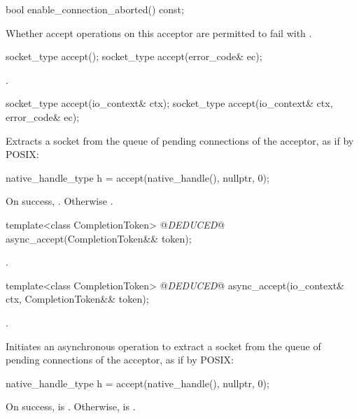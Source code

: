 \begin{itemdecl}
bool enable_connection_aborted() const;
\end{itemdecl}

\begin{itemdescr}
\pnum
\returns Whether accept operations on this acceptor are permitted to fail with .
\end{itemdescr}

\begin{itemdecl}
socket_type accept();
socket_type accept(error_code& ec);
\end{itemdecl}

\begin{itemdescr}
\pnum
\returns {}.
\end{itemdescr}

\begin{itemdecl}
socket_type accept(io_context& ctx);
socket_type accept(io_context& ctx, error_code& ec);
\end{itemdecl}

\begin{itemdescr}
\pnum
\effects Extracts a socket from the queue of pending connections of the acceptor, as if by POSIX: 
\begin{codeblock}
native_handle_type h = accept(native_handle(), nullptr, 0);
\end{codeblock}


\pnum
\returns On success, . Otherwise .
\end{itemdescr}

\begin{itemdecl}
template<class CompletionToken>
  @\textit{DEDUCED}@ async_accept(CompletionToken&& token);
\end{itemdecl}

\begin{itemdescr}
\pnum
\returns {}.
\end{itemdescr}

\begin{itemdecl}
template<class CompletionToken>
  @\textit{DEDUCED}@ async_accept(io_context& ctx, CompletionToken&& token);
\end{itemdecl}

\begin{itemdescr}
\pnum
\completionsig {}.

\pnum
\effects Initiates an asynchronous operation to extract a socket from the queue of pending connections of the acceptor, as if by POSIX: 
\begin{codeblock}
native_handle_type h = accept(native_handle(), nullptr, 0);
\end{codeblock}
 On success,  is . Otherwise,  is .
\end{itemdescr}

